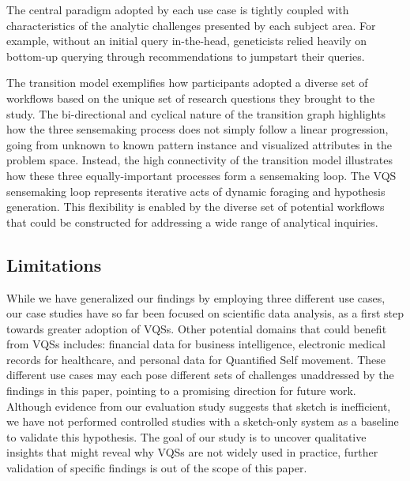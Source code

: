 The central paradigm adopted by each use case is tightly coupled with characteristics of the analytic challenges presented by each subject area. For example, without an initial query in-the-head, geneticists relied heavily on bottom-up querying through recommendations to jumpstart their queries. 
\par The transition model exemplifies how participants adopted a diverse set of workflows based on the unique set of research questions they brought to the study. The bi-directional and cyclical nature of the transition graph highlights how the three sensemaking process does not simply follow a linear progression, going from unknown to known pattern instance and visualized attributes in the problem space. Instead, the high connectivity of the transition model illustrates how these three equally-important processes form a sensemaking loop. The VQS sensemaking loop represents iterative acts of dynamic foraging and hypothesis generation. This flexibility is enabled by the diverse set of potential workflows that could be constructed for addressing a wide range of analytical inquiries.%
\subsection{Limitations}
\par While we have generalized our findings by employing three different use cases, our case studies have so far been focused on scientific data analysis, as a first step towards greater adoption of VQSs. Other potential domains that could benefit from VQSs includes: financial data for business intelligence, electronic medical records for healthcare, and personal data for Quantified Self movement. These different use cases may each pose different sets of challenges unaddressed by the findings in this paper, pointing to a promising direction for future work. Although evidence from our evaluation study suggests that sketch is inefficient, we have not performed controlled studies with a sketch-only system as a baseline to validate this hypothesis. The goal of our study is to uncover qualitative insights that might reveal why VQSs are not widely used in practice, further validation of specific findings is out of the scope of this paper.
